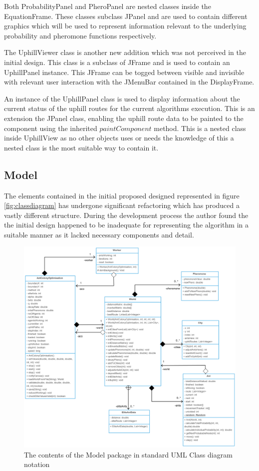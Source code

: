 Both ProbabilityPanel and PheroPanel are nested classes inside the EquationFrame. These classes subclass JPanel and are used to contain different graphics which will be used to represent information relevant to the underlying probability and pheromone functions respectively.

The UphillViewer class is another new addition which was not perceived in the initial design. This class is a subclass of JFrame and is used to contain an UphillPanel instance. This JFrame can be togged between visible and invisible with relevant user interaction with the JMenuBar contained in the DisplayFrame.

An instance of the UphillPanel class is used to display information about the current status of the uphill routes for the current algorithms execution. This is an extension the JPanel class, enabling the uphill route data to be painted to the component using the inherited $paintComponent$ method. This is a nested class inside UphillView as no other objects uses or needs the knowledge of this a nested class is the most suitable way to contain it.

\subsection{Model}

The elements contained in the initial proposed designed represented in figure \ref{fig:classdiagram} has undergone significant refactoring which has produced a vastly different structure. During the development process the author found the the initial design happened to be inadequate for representing the algorithm in a suitable manner as it lacked necessary components and detail.

\clearpage
\begin{figure}
\includegraphics[scale=0.22]{Images/chapter4/model}
\caption[Model Package Class Diagram]{The contents of the Model package in standard UML Class diagram notation}
\label{fig:classdiagramImp}
\end{figure}
\clearpage

